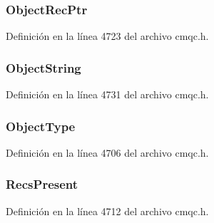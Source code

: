\subsubsection[{Object\+Rec\+Ptr}]{ Object\+Rec\+Ptr}\label{structtag_m_q_o_d_aa46059ff8062713d03173a8847594a25}


Definición en la línea 4723 del archivo cmqc.\+h.

\hypertarget{structtag_m_q_o_d_a564791473371222ceb856cfaf02d6f91}{}
\subsubsection[{Object\+String}]{ Object\+String}\label{structtag_m_q_o_d_a564791473371222ceb856cfaf02d6f91}


Definición en la línea 4731 del archivo cmqc.\+h.

\hypertarget{structtag_m_q_o_d_afe2238efcfc6d8a8de58f0622bb31caa}{}
\subsubsection[{Object\+Type}]{ Object\+Type}\label{structtag_m_q_o_d_afe2238efcfc6d8a8de58f0622bb31caa}


Definición en la línea 4706 del archivo cmqc.\+h.

\hypertarget{structtag_m_q_o_d_a7592da03e0f1c9bc79c9dd4e641dcf73}{}
\subsubsection[{Recs\+Present}]{ Recs\+Present}\label{structtag_m_q_o_d_a7592da03e0f1c9bc79c9dd4e641dcf73}


Definición en la línea 4712 del archivo cmqc.\+h.

\hypertarget{structtag_m_q_o_d_a8f35fe6f52369753de1259a9468437eb}{}
